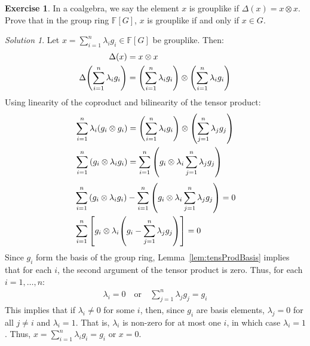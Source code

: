 \documentclass{article}
\theoremstyle{definition}
\newtheorem{Exercise}{Exercise}
\theoremstyle{remark}
\newtheorem*{Solution*}{Solution}
\theoremstyle{underline}
\theoremstyle{underline}
\begin{document}
	\begin{Exercise}
		In a coalgebra, we say the element $x$ is grouplike if $\Delta(x) = x \otimes x$. Prove that in the group ring $\mathbb F[G]$, $x$ is grouplike if and only if $x \in G$.
	\end{Exercise}
	\begin{Solution*}
		Let $x = \sum\limits_{i = 1}^n \lambda_i g_i \in \mathbb F[G]$ be grouplike. Then:
		\begin{align*}
			\Delta(x) & = x \otimes x \\
			\Delta\pqty{\sum_{i=1}^n \lambda_i g_i} & = \pqty{\sum_{i=1}^n \lambda_i g_i} \otimes \pqty{\sum_{i=1}^n \lambda_i g_i}
		\end{align*}
		Using linearity of the coproduct and bilinearity of the tensor product:
		\begin{align*}
			\sum_{i=1}^n \lambda_i \pqty{g_i \otimes g_i} & = \pqty{\sum_{i=1}^n \lambda_i g_i} \otimes \pqty{\sum_{j=1}^n \lambda_j g_j}\\
			\sum_{i=1}^n \pqty{g_i \otimes \lambda_i g_i} & = \sum_{i=1}^n \pqty{g_i \otimes \lambda_i \sum_{j=1}^n \lambda_j g_j}
		\end{align*}
		\begin{align*}
			& \sum_{i=1}^n  \pqty{ g_i \otimes \lambda_i g_i} - \sum_{i=1}^n  \pqty{ g_i \otimes \lambda_i \sum_{j=1}^n \lambda_j g_j} = 0 \\
			& \sum_{i=1}^n  \bqty{g_i \otimes \lambda_i\pqty{g_i - \sum_{j=1}^n \lambda_j g_j}} = 0
		\end{align*}
		Since $g_i$ form the basis of the group ring, Lemma~\ref{lem:tensProdBasis} implies that for each $i$, the second argument of the tensor product is zero. Thus, for each $i = 1, \ldots, n$:
		\begin{gather*}
			\lambda_i = 0 \quad \text{or} \quad \sum_{j=1}^n \lambda_j g_j = g_i
		\end{gather*}
		This implies that if $\lambda_i \ne 0$ for some $i$, then, since $g_i$ are basis elements, $\lambda_j = 0$ for all $j \ne i$ and $\lambda_i = 1$. That is, $\lambda_i$ is non-zero for at most one $i$, in which case $\lambda_i = 1$. Thus, $x = \sum\limits_{i = 1}^n \lambda_i g_i = g_i$ or $x = 0$.
	\end{Solution*}
\end{document}
